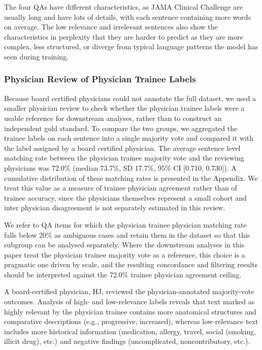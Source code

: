 \documentclass[fleqn,10pt]{wlscirep}
\begin{document}
The four QAs have different characteristics, as JAMA Clinical Challenge are usually long and have lots of details, with each sentence containing more words on average. The low relevance and irrelevant sentences also show the characteristics in perplexity that they are harder to predict as they are more complex, less structured, or diverge from typical language patterns the model has seen during training.

\subsubsection{Physician Review of Physician Trainee Labels}

Because board certified physicians could not annotate the full dataset, we used a smaller physician review to check whether the physician trainee labels were a usable reference for downstream analyses, rather than to construct an independent gold standard. To compare the two groups, we aggregated the trainee labels on each sentence into a single majority vote and compared it with the label assigned by a board certified physician. The average sentence level matching rate between the physician trainee majority vote and the reviewing physicians was 72.0\% (median 73.7\%, SD 17.7\%, 95\% CI [0.710, 0.730]). A cumulative distribution of these matching rates is presented in the Appendix. We treat this value as a measure of trainee physician agreement rather than of trainee accuracy, since the physicians themselves represent a small cohort and inter physician disagreement is not separately estimated in this review.

We refer to QA items for which the physician trainee physician matching rate falls below 20\% as ambiguous cases and retain them in the dataset so that this subgroup can be analysed separately. Where the downstream analyses in this paper treat the physician trainee majority vote as a reference, this choice is a pragmatic one driven by scale, and the resulting concordance and filtering results should be interpreted against the 72.0\% trainee physician agreement ceiling.


A board-certified physician, HJ, reviewed the physician-annotated majority-vote outcomes. Analysis of high- and low-relevance labels reveals that text marked as highly relevant by the physician trainee contains more anatomical structures and comparative descriptions (e.g., progressive, increased), whereas low-relevance text includes more historical information (medication, allergy, travel, social (smoking, illicit drug), etc.) and negative findings (uncomplicated, noncontributory, etc.). %
\end{document}
